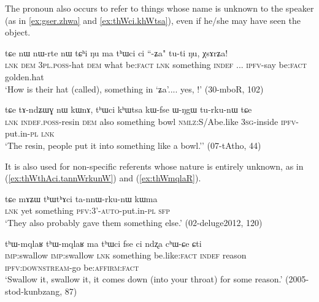 The pronoun  also occurs to refer to things whose name is unknown to the speaker (as in \ref{ex:gser.zhwa} and \ref{ex:thWci.khWtsa}), even if he/she may have seen the object.
 
\begin{exe}
\ex \label{ex:gser.zhwa}
\gll tɕe nɯ nɯ-rte nɯ tɕʰi ŋu ma tʰɯci ci ``-ʑa" tu-ti ŋu, χsɤrʑa! \\
\textsc{lnk} \textsc{dem} \textsc{3pl.poss}-hat \textsc{dem} what be:\textsc{fact} \textsc{lnk} something \textsc{indef} ... \textsc{ipfv}-say be:\textsc{fact} golden.hat \\
\glt `How is their hat (called), something in `ʑa'.... yes, !' (30-mboR, 102)
\end{exe}

\begin{exe}
\ex \label{ex:thWci.khWtsa}
\gll  tɕe tɤ-ndʑɯɣ nɯ kɯnɤ, tʰɯci kʰɯtsa kɯ-fse ɯ-ŋgɯ tu-rku-nɯ tɕe   \\
\textsc{lnk} \textsc{indef.poss}-resin \textsc{dem} also something bowl \textsc{nmlz}:S/Abe.like \textsc{3sg}-inside \textsc{ipfv}-put.in-\textsc{pl} \textsc{lnk}   \\
\glt `The resin, people put it into something like a bowl.'' (07-tAtho, 44)
\end{exe}

It is also used for non-specific referents whose nature is entirely unknown, as in  (\ref{ex:thWthAci.tannWrkunW}) and (\ref{ex:thWmqlaR}).

\begin{exe}
\ex \label{ex:thWthAci.tannWrkunW}
\gll   tɕe mɤʑɯ tʰɯtʰɤci ta-nnɯ-rku-nɯ kɯma  \\
\textsc{lnk} yet something \textsc{pfv}:3'-\textsc{auto}-put.in-\textsc{pl} \textsc{sfp} \\
\glt `They also probably gave them something else.' (02-deluge2012, 120)
 \end{exe}
 
  \begin{exe}
\ex \label{ex:thWmqlaR}
\gll 
 tʰɯ-mqlaʁ tʰɯ-mqlaʁ ma tʰɯci fse ci ndʐa cʰɯ-ɕe ɕti \\
 \textsc{imp}:swallow  \textsc{imp}:swallow \textsc{lnk} something be.like:\textsc{fact} \textsc{indef} reason \textsc{ipfv:downstream}-go be:\textsc{affirm:fact} \\
\glt `Swallow it, swallow it, it comes down (into your throat) for some reason.' (2005-stod-kunbzang, 87)
  \end{exe}

